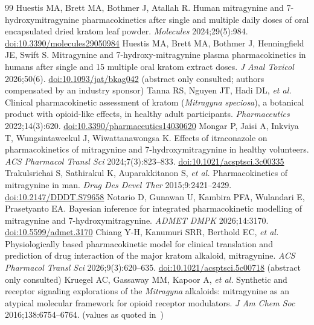 \documentclass[10pt,a4paper]{article}
\begin{document}
\begin{thebibliography}{99}\small
{} Huestis MA, Brett MA, Bothmer J, Atallah R. Human mitragynine and 7-hydroxymitragynine pharmacokinetics after
single and multiple daily doses of oral encapsulated dried kratom leaf powder. \emph{Molecules} 2024;29(5):984.
\href{https://doi.org/10.3390/molecules29050984}{doi:10.3390/molecules29050984}
 Huestis MA, Brett MA, Bothmer J, Henningfield JE, Swift S. Mitragynine and 7-hydroxy-mitragynine plasma
pharmacokinetics in humans after single and 15 multiple oral kratom extract doses. \emph{J Anal Toxicol} 2026;50(6).
\href{https://doi.org/10.1093/jat/bkag042}{doi:10.1093/jat/bkag042} (abstract only consulted; authors compensated by an industry sponsor)
 Tanna RS, Nguyen JT, Hadi DL, \emph{et al.} Clinical pharmacokinetic assessment of kratom (\emph{Mitragyna speciosa}),
a botanical product with opioid-like effects, in healthy adult participants. \emph{Pharmaceutics} 2022;14(3):620.
\href{https://doi.org/10.3390/pharmaceutics14030620}{doi:10.3390/pharmaceutics14030620}
 Mongar P, Jaisi A, Inkviya T, Wungsintaweekul J, Wiwattanawongsa K. Effects of itraconazole on pharmacokinetics of
mitragynine and 7-hydroxymitragynine in healthy volunteers. \emph{ACS Pharmacol Transl Sci} 2024;7(3):823--833.
\href{https://doi.org/10.1021/acsptsci.3c00335}{doi:10.1021/acsptsci.3c00335}
 Trakulsrichai S, Sathirakul K, Auparakkitanon S, \emph{et al.} Pharmacokinetics of mitragynine in man.
\emph{Drug Des Devel Ther} 2015;9:2421--2429. \href{https://doi.org/10.2147/DDDT.S79658}{doi:10.2147/DDDT.S79658}
 Notario D, Gunawan U, Kambira PFA, Wulandari E, Prasetyanto EA. Bayesian inference for integrated pharmacokinetic
modelling of mitragynine and 7-hydroxymitragynine. \emph{ADMET DMPK} 2026;14:3170.
\href{https://doi.org/10.5599/admet.3170}{doi:10.5599/admet.3170}
 Chiang Y-H, Kanumuri SRR, Berthold EC, \emph{et al.} Physiologically based pharmacokinetic model for clinical
translation and prediction of drug interaction of the major kratom alkaloid, mitragynine. \emph{ACS Pharmacol Transl Sci} 2026;9(3):620--635.
\href{https://doi.org/10.1021/acsptsci.5c00718}{doi:10.1021/acsptsci.5c00718} (abstract only consulted)
 Kruegel AC, Gassaway MM, Kapoor A, \emph{et al.} Synthetic and receptor signaling explorations of the
\emph{Mitragyna} alkaloids: mitragynine as an atypical molecular framework for opioid receptor modulators.
\emph{J Am Chem Soc} 2016;138:6754--6764. (values as quoted in~\cite{kruegel2019,fda7oh})

\end{thebibliography}
\end{document}
